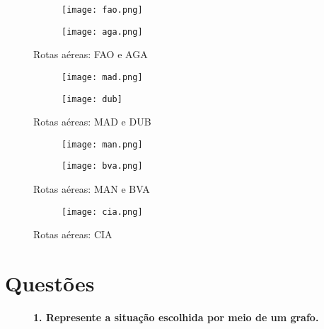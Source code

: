 \documentclass[a4wide]{report}
\begin{document}
\begin{figure*}[t!]
    \centering
    \begin{subfigure}[t]{0.49\textwidth}
        \centering
        \texttt{[image: fao.png]}
            \end{subfigure}
            \begin{subfigure}[t]{0.49\textwidth}
        \centering
        \texttt{[image: aga.png]}
            \end{subfigure}
            \caption{Rotas aéreas: FAO e AGA}
\end{figure*}

\begin{figure*}[t!]
    \centering
    \begin{subfigure}[t]{0.49\textwidth}
        \centering
        \texttt{[image: mad.png]}
            \end{subfigure}
            \begin{subfigure}[t]{0.49\textwidth}
        \centering
        \texttt{[image: dub]}
            \end{subfigure}
            \caption{Rotas aéreas: MAD e DUB}
\end{figure*}

\begin{figure*}[t!]
    \centering
    \begin{subfigure}[t]{0.49\textwidth}
        \centering
        \texttt{[image: man.png]}
            \end{subfigure}
            \begin{subfigure}[t]{0.49\textwidth}
        \centering
        \texttt{[image: bva.png]}
            \end{subfigure}
            \caption{Rotas aéreas: MAN e BVA}
\end{figure*}

\begin{figure*}[h]
    \centering
    \begin{subfigure}[t]{0.49\textwidth}
        \centering
        \texttt{[image: cia.png]}
            \end{subfigure}
            \caption{Rotas aéreas: CIA}
\end{figure*}

\chapter{Questões}
\label{cap:questoes}
\begin{description} 
\item[]\textbf{1. Represente a situação escolhida por meio de um grafo.}
\end{description}
\end{document}
